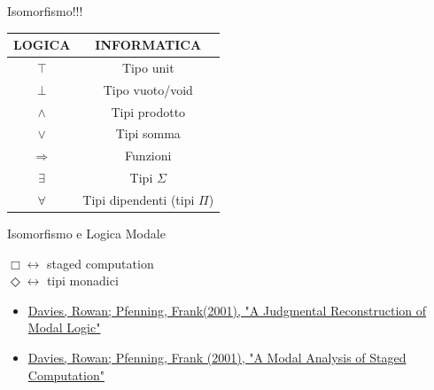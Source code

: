 \documentclass{beamer}
\begin{document}
\begin{frame}{Isomorfismo!!!}
\begin{center}
  \begin{tabular}{ | c | c |}
    \hline
    \alert{\textbf{LOGICA}} & \alert{\textbf{INFORMATICA}} \\
    \hline
    $\top$ & Tipo unit \\
    \hline
    $\bot $ & Tipo vuoto/void \\
    \hline
   $\wedge$ & Tipi prodotto \\  
    \hline
   $\vee$ & Tipi somma \\
    \hline
   $\Rightarrow$ & Funzioni \\ 
    \hline
   $\exists$ & Tipi $\Sigma$ \\ 
    \hline
    $\forall $ & Tipi dipendenti (tipi $\Pi$)\\ 
    \hline

  \end{tabular}
\end{center}
\end{frame}


\begin{frame}{Isomorfismo e Logica Modale}
\begin{center}
   $\Box \longleftrightarrow $ staged computation \\
   $\Diamond \longleftrightarrow $ tipi monadici
\end{center}

\begin{itemize}
  \item \href{https://www.cs.cmu.edu/~fp/papers/mscs00.pdf}{Davies, Rowan;
    Pfenning, Frank(2001), "A Judgmental Reconstruction of Modal Logic"}
  \item  \href{https://www.cs.cmu.edu/~fp/papers/jacm00.pdf}{Davies, Rowan; Pfenning, Frank (2001), "A Modal Analysis of Staged Computation"}
\end{itemize}
\end{frame}
\end{document}
